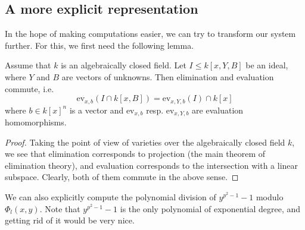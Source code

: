 \subsection{A more explicit representation}
In the hope of making computations easier, we can try to transform our system further.
For this, we first need the following lemma.
\begin{lemma}
    Assume that $k$ is an algebraically closed field.
    Let $I \leq k[x, Y, B]$ be an ideal, where $Y$ and $B$ are vectors of unknowns.
    Then elimination and evaluation commute, i.e.
    \begin{equation*}
        \mathrm{ev}_{x, b}(I \cap k[x, B]) = \mathrm{ev}_{x, Y, b}(I) \cap k[x]
    \end{equation*}
    where $b \in k[x]^n$ is a vector and $\mathrm{ev}_{x, b}$ resp. $\mathrm{ev}_{x, Y, b}$ are evaluation homomorphisms.
\end{lemma}
\begin{proof}
    Taking the point of view of varieties over the algebraically closed field $k$, we see that elimination corresponds to projection (the main theorem of elimination theory), and evaluation corresponds to the intersection with a linear subspace.
    Clearly, both of them commute in the above sense.
\end{proof}
We can also explicitly compute the polynomial division of $y^{p^2 - 1} - 1$ modulo $\Phi_l(x, y)$.
Note that $y^{p^2 - 1} - 1$ is the only polynomial of exponential degree, and getting rid of it would be very nice.
